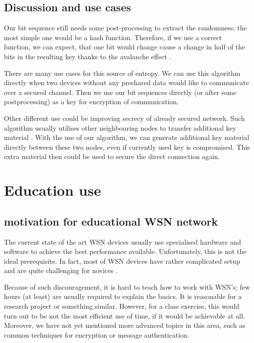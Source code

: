 \documentclass[
  print, %
  Table,   %
  nolof,     %
  nolot,     %
           oneside
]{fithesis3}
\begin{document}
  \section{Discussion and use cases}\label{sec:use}
  Our bit sequence still needs some post-processing to extract the randomness; the most simple one would be a hash function. Therefore, if we use a correct function, we can expect, that one bit would change cause a change in half of the bits in the resulting key thanks to the avalanche effect \cite{Webster1986}.

  There are many use cases for this source of entropy. We can use this algorithm directly when two devices without any preshared data would like to communicate over a secured channel. Then we use our bit sequences directly (or after some postprocessing) as a key for encryption of communication.

  Other different use could be improving secrecy of already secured network. Such algorithm usually utilises other neighbouring nodes to transfer additional key material \cite{2015-wistp-ostadal}. With the use of our algorithm, we can generate additional key material directly between these two nodes, even if currently used key is compromised. This extra material then could be used to secure the direct connection again.


\chapter{Education use}\label{ch:edu}

  \section{motivation for educational WSN network}
  The current state of the art WSN devices usually use specialised hardware and software to achieve the best performance available. %
  Unfortunately, this is not the ideal prerequisite. In fact, most of WSN devices have rather complicated setup and are quite challenging for novices \cite{hu2010wireless}.

  Because of such discouragement, it is hard to teach how to work with WSN’s; few hours (at least) are usually required to explain the basics. It is reasonable for a research project or something similar. However, for a class exercise, this would turn out to be not the most efficient use of time, if it would be achievable at all. Moreover, we have not yet mentioned more advanced topics in this area, such as common techniques for encryption or message authentication.
\end{document}
